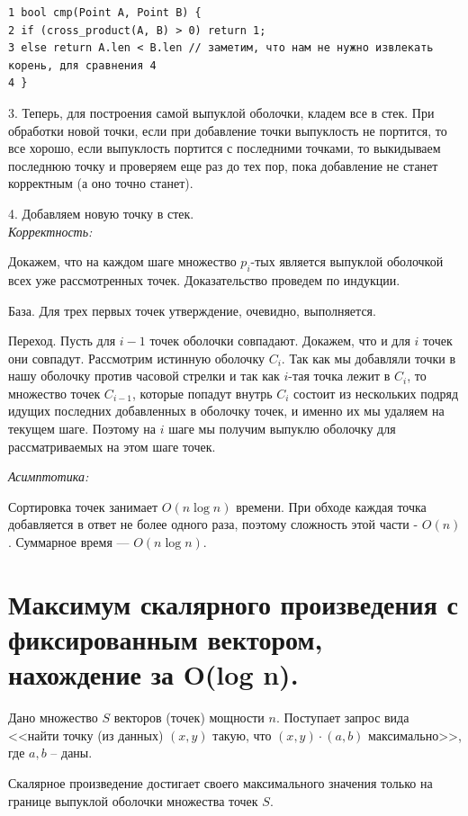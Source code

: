 \begin{lstlisting}
1 bool cmp(Point A, Point B) {
2 if (cross_product(A, B) > 0) return 1;
3 else return A.len < B.len // заметим, что нам не нужно извлекать корень, для сравнения 4 
4 }
\end{lstlisting}

3. Теперь, для построения самой выпуклой оболочки, кладем все в стек.
При обработки новой точки, если при добавление точки выпуклость не портится, то все хорошо, если выпуклость портится с последними точками, то выкидываем последнюю точку и проверяем еще раз до тех пор, пока добавление не станет корректным (а оно точно станет).

4. Добавляем новую точку в стек.\\

\textit{Корректность:}

\Proof
Докажем, что на каждом шаге множество $p_i$-тых является выпуклой оболочкой всех уже рассмотренных точек. Доказательство проведем по индукции.

База. Для трех первых точек утверждение, очевидно, выполняется.

Переход. Пусть для $i-1$ точек оболочки совпадают. Докажем, что и для $i$ точек они совпадут.
Рассмотрим истинную оболочку $C_i$. Так как мы добавляли точки в нашу оболочку против часовой стрелки и так как $i$-тая точка лежит в $C_i$, то множество точек $C_{i-1}$, которые попадут внутрь $C_i$ состоит из нескольких подряд идущих последних добавленных в оболочку точек, и именно их мы удаляем на текущем шаге. Поэтому на $i$ шаге мы получим выпуклю оболочку для рассматриваемых на этом шаге точек. 

\EndProof

\textit{Асимптотика:}

Сортировка точек занимает $O(n\log n)$ времени. При обходе каждая точка добавляется в ответ не более одного раза, поэтому сложность этой части - $O(n)$. Суммарное время — $O(n \log n)$.
\newpage{}

\section{Максимум скалярного произведения с фиксированным вектором, нахождение за O(log n).}

Дано множество $S$ векторов (точек) мощности $n$. Поступает запрос вида <<найти точку (из данных) $(x, y)$ такую, что $(x, y) \cdot (a, b)$ максимально>>, где $a, b$ -- даны.

\Statement Скалярное произведение достигает своего максимального значения только на границе выпуклой оболочки множества точек $S$.

